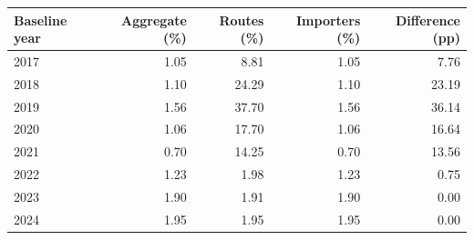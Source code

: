 \begin{tabular}{lrrrr}
\toprule
Baseline year & Aggregate (\%) & Routes (\%) & Importers (\%) & Difference (pp) \\
\midrule
2017 & 1.05 & 8.81 & 1.05 & 7.76 \\
2018 & 1.10 & 24.29 & 1.10 & 23.19 \\
2019 & 1.56 & 37.70 & 1.56 & 36.14 \\
2020 & 1.06 & 17.70 & 1.06 & 16.64 \\
2021 & 0.70 & 14.25 & 0.70 & 13.56 \\
2022 & 1.23 & 1.98 & 1.23 & 0.75 \\
2023 & 1.90 & 1.91 & 1.90 & 0.00 \\
2024 & 1.95 & 1.95 & 1.95 & 0.00 \\
\bottomrule
\end{tabular}
